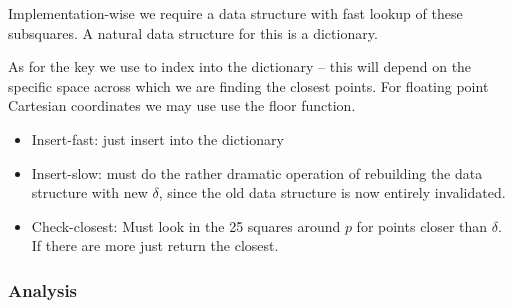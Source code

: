 \documentclass[../notes.tex]{subfiles}
\begin{document}
Implementation-wise we require a data structure with fast lookup of these subsquares. A natural data structure for this is a dictionary. 

As for the key we use to index into the dictionary -- this will depend on the specific space across which we are finding the closest points.
For floating point Cartesian coordinates we may use use the floor function.

\begin{itemize}
    \item Insert-fast: just insert into the dictionary
    \item Insert-slow: must do the rather dramatic operation of rebuilding the data structure with new $ \delta$, since the old data structure is now entirely invalidated.
    \item Check-closest: Must look in the 25 squares around $ p $ for points closer than $ \delta $. If there are more just return the closest. 
\end{itemize}

\subsubsection{Analysis}
\end{document}
